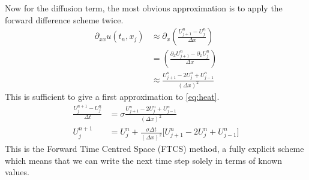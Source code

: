 \documentclass[11pt, a4pape draft]{article}
\newcommand{\Dt}{\Delta t}
\newcommand{\Dx}{\Delta x}
\begin{document}
        Now for the diffusion term, the most obvious approximation is to apply the forward difference scheme twice.
        \begin{align*}
        \partial_{xx} u(t_n,x_j) &\approx \partial_x \left(\frac{U^n_{j+1}- U^n_j}{\Dx}\right)\\
        &=  \left(\frac{\partial_xU^n_{j+1} - \partial_xU^n_j}{\Dx}\right)\\
        &\approx \frac{U^n_{j+1} - 2U^n_{j} + U^n_{j-1}}{(\Dx)^2}
        \end{align*}
        This is sufficient to give a first approximation to \eqref{eq:heat}.
        \begin{align}\label{eq:FTCS_heat}
        \frac{U^{n+1}_j- U^n_j}{\Dt} &= \sigma \frac{U^n_{j+1} - 2U^n_{j} + U^n_{j-1}}{(\Dx)^2}\\
        U^{n+1}_j &= U^n_j +  \frac{\sigma\Dt}{(\Dx)^2}\lbrack U^n_{j+1} - 2U^n_{j} + U^n_{j-1}\rbrack 
        \end{align}
        This is the Forward Time Centred Space (FTCS) method, a fully explicit scheme which means that we can write the next time step solely in terms of known values.
\end{document}
